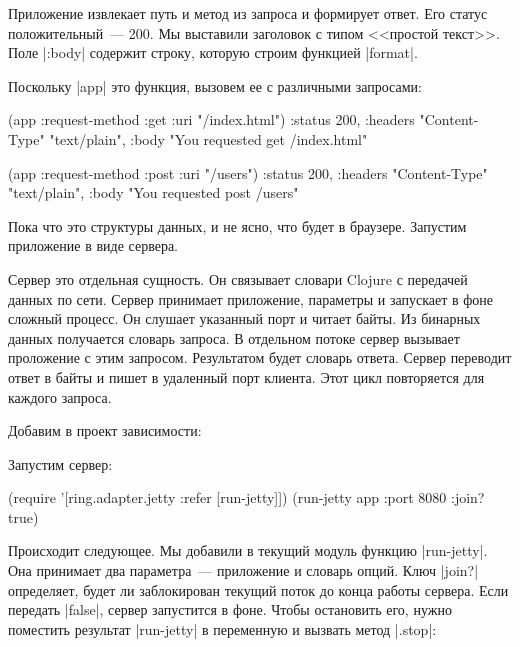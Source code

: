 Приложение извлекает путь и метод из запроса и формирует ответ. Его статус
положительный~--- 200. Мы выставили заголовок с типом <<простой текст>>. Поле
\spverb|:body| содержит строку, которую строим функцией \spverb|format|.

Поскольку \spverb|app| это функция, вызовем ее с различными запросами:

\begin{english}
  \begin{clojure}
(app {:request-method :get :uri "/index.html"})
{:status 200,
 :headers {"Content-Type" "text/plain"},
 :body "You requested get /index.html"}

(app {:request-method :post :uri "/users"})
{:status 200,
 :headers {"Content-Type" "text/plain"},
 :body "You requested post /users"}
  \end{clojure}
\end{english}

Пока что это структуры данных, и не ясно, что будет в браузере. Запустим
приложение в виде сервера.

Сервер это отдельная сущность. Он связывает словари Clojure с передачей данных
по сети. Сервер принимает приложение, параметры и запускает в фоне сложный
процесс. Он слушает указанный порт и читает байты. Из бинарных данных получается
словарь запроса. В отдельном потоке сервер вызывает проложение с этим
запросом. Результатом будет словарь ответа. Сервер переводит ответ в байты и
пишет в удаленный порт клиента. Этот цикл повторяется для каждого запроса.

Добавим в проект зависимости:

\begin{english}
  \begin{clojure}
  \end{clojure}
\end{english}

Запустим сервер:

\begin{english}
  \begin{clojure}
(require '[ring.adapter.jetty :refer [run-jetty]])
(run-jetty app {:port 8080 :join? true})
  \end{clojure}
\end{english}

Происходит следующее. Мы добавили в текущий модуль функцию
\spverb|run-jetty|. Она принимает два параметра~--- приложение и словарь
опций. Ключ \spverb|join?| определяет, будет ли заблокирован текущий поток до
конца работы сервера. Если передать \spverb|false|, сервер запустится в
фоне. Чтобы остановить его, нужно поместить результат \spverb|run-jetty| в
переменную и вызвать метод \spverb|.stop|:

